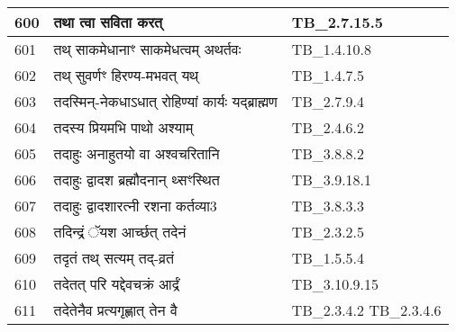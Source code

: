 \documentclass[17pt]{extarticle}
\begin{document}
\begin{longtable}{||p{0.4in}||p{4.9in}||p{0.9in}||}
    \hline
        
    600 & तथा त्वा सविता करत् & TB\_2.7.15.5       \\
    
    \hline
        
    601 & तथ् साकमेधानाꣳ साकमेधत्वम् अथर्तवः & TB\_1.4.10.8       \\
    
    \hline
        
    602 & तथ् सुवर्णꣳ हिरण्य{-}मभवत् यथ् & TB\_1.4.7.5       \\
    
    \hline
        
    603 & तदस्मिन्{-}नेकधाऽधात् रोहिण्यां कार्यः यद्ब्राह्मण & TB\_2.7.9.4       \\
    
    \hline
        
    604 & तदस्य प्रियमभि पाथो अश्याम् & TB\_2.4.6.2       \\
    
    \hline
        
    605 & तदाहुः अनाहुतयो वा अश्वचरितानि & TB\_3.8.8.2       \\
    
    \hline
        
    606 & तदाहुः द्वादश ब्रह्मौदनान् थ्सꣳस्थित & TB\_3.9.18.1       \\
    
    \hline
        
    607 & तदाहुः द्वादशारत्नी रशना कर्तव्या3 & TB\_3.8.3.3       \\
    
    \hline
        
    608 & तदिन्द्रं ॅयश आर्च्छत् तदेनं & TB\_2.3.2.5       \\
    
    \hline
        
    609 & तदृतं तथ् सत्यम् तद्{-}व्रतं & TB\_1.5.5.4       \\
    
    \hline
        
    610 & तदेतत् परि यद्देवचक्रं आर्द्रं & TB\_3.10.9.15       \\
    
    \hline
        
    611 & तदेतेनैव प्रत्यगृह्णात् तेन वै & TB\_2.3.4.2 TB\_2.3.4.6       \\
    
    \hline
        

\end{longtable}
\end{document}
